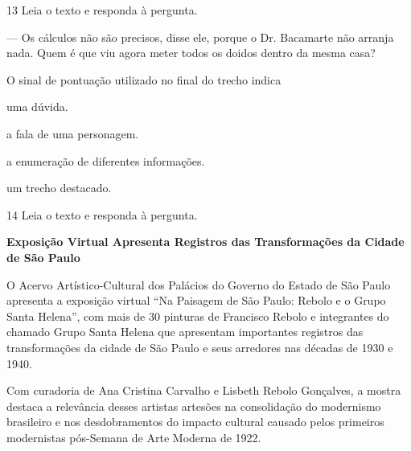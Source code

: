 \num{13} Leia o texto e responda à pergunta.

\begin{myquote}
--- Os cálculos não são precisos, disse ele, porque o Dr. Bacamarte não
arranja nada. Quem é que viu agora meter todos os doidos dentro da mesma
casa?

\end{myquote}

O sinal de pontuação utilizado no final do trecho indica

\begin{escolha}
  \item uma dúvida.

  \item a fala de uma personagem.

  \item a enumeração de diferentes informações.

  \item um trecho destacado.
\end{escolha}

\num{14} Leia o texto e responda à pergunta.

\begin{myquote}
\textbf{Exposição Virtual Apresenta Registros das Transformações 
da Cidade de São Paulo}

O Acervo Artístico-Cultural dos Palácios do Governo do Estado de São
Paulo apresenta a exposição virtual ``Na Paisagem de São Paulo: Rebolo e
o Grupo Santa Helena'', com mais de 30 pinturas de Francisco Rebolo e
integrantes do chamado Grupo Santa Helena que apresentam importantes
registros das transformações da cidade de São Paulo e seus arredores nas
décadas de 1930 e 1940.

Com curadoria de Ana Cristina Carvalho e Lisbeth Rebolo Gonçalves, a
mostra destaca a relevância desses artistas artesões na consolidação do
modernismo brasileiro e nos desdobramentos do impacto cultural causado
pelos primeiros modernistas pós-Semana de Arte Moderna de 1922.

\end{myquote}

